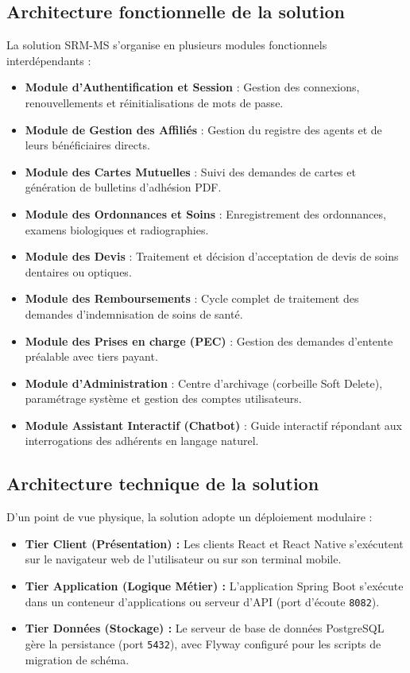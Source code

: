 \subsection{Architecture fonctionnelle de la solution}
La solution SRM-MS s'organise en plusieurs modules fonctionnels interdépendants :
\begin{itemize}
    \item \textbf{Module d'Authentification et Session} : Gestion des connexions, renouvellements et réinitialisations de mots de passe.
    \item \textbf{Module de Gestion des Affiliés} : Gestion du registre des agents et de leurs bénéficiaires directs.
    \item \textbf{Module des Cartes Mutuelles} : Suivi des demandes de cartes et génération de bulletins d'adhésion PDF.
    \item \textbf{Module des Ordonnances et Soins} : Enregistrement des ordonnances, examens biologiques et radiographies.
    \item \textbf{Module des Devis} : Traitement et décision d'acceptation de devis de soins dentaires ou optiques.
    \item \textbf{Module des Remboursements} : Cycle complet de traitement des demandes d'indemnisation de soins de santé.
    \item \textbf{Module des Prises en charge (PEC)} : Gestion des demandes d'entente préalable avec tiers payant.
    \item \textbf{Module d'Administration} : Centre d'archivage (corbeille Soft Delete), paramétrage système et gestion des comptes utilisateurs.
    \item \textbf{Module Assistant Interactif (Chatbot)} : Guide interactif répondant aux interrogations des adhérents en langage naturel.
\end{itemize}

\subsection{Architecture technique de la solution}
D'un point de vue physique, la solution adopte un déploiement modulaire :
\begin{itemize}
    \item \textbf{Tier Client (Présentation) :} Les clients React et React Native s'exécutent sur le navigateur web de l'utilisateur ou sur son terminal mobile.
    \item \textbf{Tier Application (Logique Métier) :} L'application Spring Boot s'exécute dans un conteneur d'applications ou serveur d'API (port d'écoute \texttt{8082}).
    \item \textbf{Tier Données (Stockage) :} Le serveur de base de données PostgreSQL gère la persistance (port \texttt{5432}), avec Flyway configuré pour les scripts de migration de schéma.
\end{itemize}

